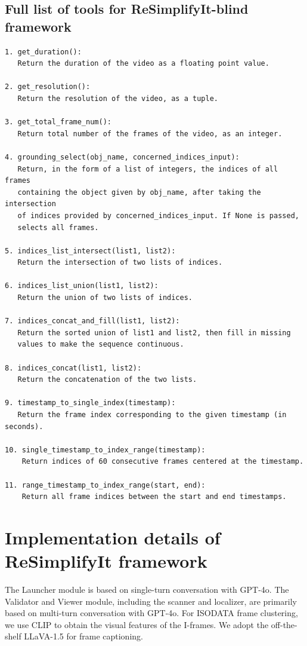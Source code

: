 \subsection{Full list of tools for ReSimplifyIt-blind framework}
\begin{lstlisting}
1. get_duration():
   Return the duration of the video as a floating point value.

2. get_resolution():
   Return the resolution of the video, as a tuple.

3. get_total_frame_num():
   Return total number of the frames of the video, as an integer.

4. grounding_select(obj_name, concerned_indices_input):
   Return, in the form of a list of integers, the indices of all frames
   containing the object given by obj_name, after taking the intersection
   of indices provided by concerned_indices_input. If None is passed,
   selects all frames.

5. indices_list_intersect(list1, list2):
   Return the intersection of two lists of indices.

6. indices_list_union(list1, list2):
   Return the union of two lists of indices.

7. indices_concat_and_fill(list1, list2):
   Return the sorted union of list1 and list2, then fill in missing
   values to make the sequence continuous.

8. indices_concat(list1, list2):
   Return the concatenation of the two lists.

9. timestamp_to_single_index(timestamp):
   Return the frame index corresponding to the given timestamp (in seconds).

10. single_timestamp_to_index_range(timestamp):
    Return indices of 60 consecutive frames centered at the timestamp.

11. range_timestamp_to_index_range(start, end):
    Return all frame indices between the start and end timestamps.
\end{lstlisting}

\section{Implementation details of ReSimplifyIt framework}
\label{appendix:imp}
The Launcher module is based on single-turn conversation with GPT-4o. The Validator and Viewer module, including the scanner and localizer, are primarily based on multi-turn conversation with GPT-4o. For ISODATA frame clustering, we use CLIP \citep{clip} to obtain the visual features of the I-frames. We adopt the off-the-shelf LLaVA-1.5 \citep{Liu_2024_CVPR} for frame captioning. 

